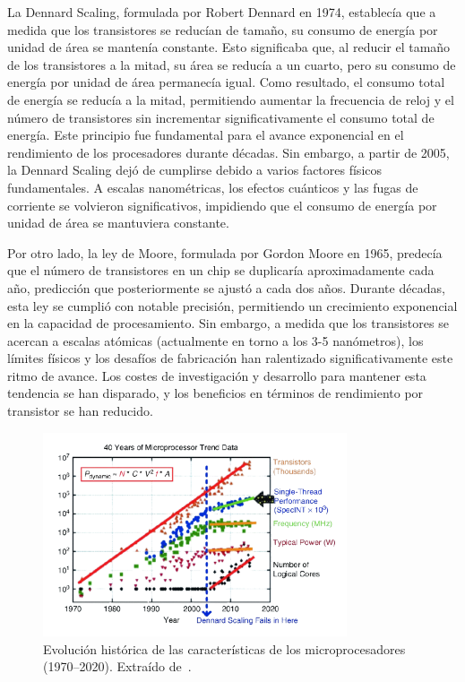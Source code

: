 \documentclass[11pt,spanish,listoffigures,listoftables]{tfgetsinf}
\begin{document}
La Dennard Scaling\cite{dennard1974design}, formulada por Robert Dennard en 1974, establecía que a medida que los transistores se reducían de tamaño, su consumo de energía por unidad de área se mantenía constante. Esto significaba que, al reducir el tamaño de los transistores a la mitad, su área se reducía a un cuarto, pero su consumo de energía por unidad de área permanecía igual. Como resultado, el consumo total de energía se reducía a la mitad, permitiendo aumentar la frecuencia de reloj y el número de transistores sin incrementar significativamente el consumo total de energía. Este principio fue fundamental para el avance exponencial en el rendimiento de los procesadores durante décadas. Sin embargo, a partir de 2005, la Dennard Scaling dejó de cumplirse debido a varios factores físicos fundamentales. A escalas nanométricas, los efectos cuánticos y las fugas de corriente se volvieron significativos, impidiendo que el consumo de energía por unidad de área se mantuviera constante.

Por otro lado, la ley de Moore\cite{moore1965cramming}, formulada por Gordon Moore en 1965, predecía que el número de transistores en un chip se duplicaría aproximadamente cada año, predicción que posteriormente se ajustó a cada dos años. Durante décadas, esta ley se cumplió con notable precisión, permitiendo un crecimiento exponencial en la capacidad de procesamiento. Sin embargo, a medida que los transistores se acercan a escalas atómicas (actualmente en torno a los 3-5 nanómetros), los límites físicos y los desafíos de fabricación han ralentizado significativamente este ritmo de avance. Los costes de investigación y desarrollo para mantener esta tendencia se han disparado, y los beneficios en términos de rendimiento por transistor se han reducido.

\begin{figure}[H]
   \centering
   \includegraphics[width=0.8\textwidth]{images/estado_del_arte/dennard_scaling.png}
   \caption[Evolución histórica de las características de los microprocesadores (1970--2020)]{Evolución histórica de las características de los microprocesadores (1970--2020). Extraído de~\cite[p.~8]{ConteRebootingComputing}.}
   \label{fig:dennard_scaling}
\end{figure}
\end{document}
